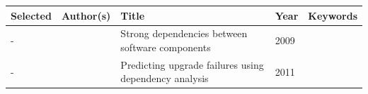 \documentclass[]{book}
\begin{document}
\begin{longtable}[]{@{}lllll@{}}
\toprule
\begin{minipage}[b]{0.01\columnwidth}\raggedright\strut
Selected\strut
\end{minipage} & \begin{minipage}[b]{0.09\columnwidth}\raggedright\strut
Author(s)\strut
\end{minipage} & \begin{minipage}[b]{0.34\columnwidth}\raggedright\strut
Title\strut
\end{minipage} & \begin{minipage}[b]{0.02\columnwidth}\raggedright\strut
Year\strut
\end{minipage} & \begin{minipage}[b]{0.39\columnwidth}\raggedright\strut
Keywords\strut
\end{minipage}\tabularnewline
\midrule
\endhead
\begin{minipage}[t]{0.01\columnwidth}\raggedright\strut
-\strut
\end{minipage} & \begin{minipage}[t]{0.09\columnwidth}\raggedright\strut
\citet{Abate2009}\strut
\end{minipage} & \begin{minipage}[t]{0.34\columnwidth}\raggedright\strut
Strong dependencies between software components\strut
\end{minipage} & \begin{minipage}[t]{0.02\columnwidth}\raggedright\strut
2009\strut
\end{minipage} & \begin{minipage}[t]{0.39\columnwidth}\raggedright\strut
\strut
\end{minipage}\tabularnewline
\begin{minipage}[t]{0.01\columnwidth}\raggedright\strut
-\strut
\end{minipage} & \begin{minipage}[t]{0.09\columnwidth}\raggedright\strut
\citet{Abate2011}\strut
\end{minipage} & \begin{minipage}[t]{0.34\columnwidth}\raggedright\strut
Predicting upgrade failures using dependency analysis\strut
\end{minipage} & \begin{minipage}[t]{0.02\columnwidth}\raggedright\strut
2011\strut
\end{minipage} & \begin{minipage}[t]{0.39\columnwidth}\raggedright\strut

\end{minipage}
\end{longtable}
\end{document}
